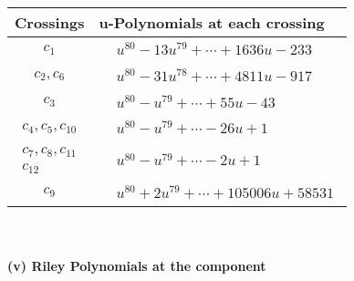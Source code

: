\documentclass[1p]{elsarticle_modified}
\theoremstyle{definition}
\begin{document}
\begin{tabular}{m{50pt}|m{274pt}}
Crossings & \hspace{64pt}u-Polynomials at each crossing \\
\hline $$\begin{aligned}c_{1}\end{aligned}$$&$\begin{aligned}
&u^{80}-13 u^{79}+\cdots+1636 u-233
\end{aligned}$\\
\hline $$\begin{aligned}c_{2},c_{6}\end{aligned}$$&$\begin{aligned}
&u^{80}-31 u^{78}+\cdots+4811 u-917
\end{aligned}$\\
\hline $$\begin{aligned}c_{3}\end{aligned}$$&$\begin{aligned}
&u^{80}- u^{79}+\cdots+55 u-43
\end{aligned}$\\
\hline $$\begin{aligned}c_{4},c_{5},c_{10}\end{aligned}$$&$\begin{aligned}
&u^{80}- u^{79}+\cdots-26 u+1
\end{aligned}$\\
\hline $$\begin{aligned}c_{7},c_{8},c_{11}\\c_{12}\end{aligned}$$&$\begin{aligned}
&u^{80}- u^{79}+\cdots-2 u+1
\end{aligned}$\\
\hline $$\begin{aligned}c_{9}\end{aligned}$$&$\begin{aligned}
&u^{80}+2 u^{79}+\cdots+105006 u+58531
\end{aligned}$\\
\hline
\end{tabular}\\~\\
\newpage\renewcommand{\arraystretch}{1}
\flushleft \textbf{(v) Riley Polynomials at the component}\newline \\
\end{document}
